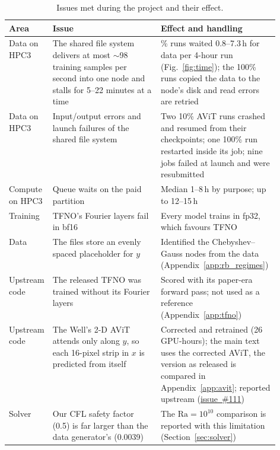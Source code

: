 \documentclass[11pt]{article}
\begin{document}
\begin{table}[tp]
\centering\footnotesize
\begin{tabularx}{\linewidth}{@{}>{\raggedright\arraybackslash}p{0.13\linewidth}>{\raggedright\arraybackslash}p{0.4\linewidth}>{\raggedright\arraybackslash}X@{}}
\toprule
Area & Issue & Effect and handling \\
\midrule
Data on HPC3 & The shared file system delivers at most $\sim$98 training samples per second into one node and stalls
for 5--22 minutes at a time & 10\% runs waited 0.8--7.3\,h for data per 4-hour run (Fig.~\ref{fig:time}); the 100\%
runs copied the data to the node's disk and read errors are retried \\ \addlinespace[3pt]
\midrule
Data on HPC3 & Input/output errors and launch failures of the shared file system & Two 10\% AViT runs crashed and
resumed from their checkpoints; one 100\% run restarted inside its job; nine jobs failed at launch and were
resubmitted \\ \addlinespace[3pt]
\midrule
Compute on HPC3 & Queue waits on the paid partition & Median 1--8\,h by purpose; up to 12--15\,h \\
\addlinespace[3pt]
\midrule
Training & TFNO's Fourier layers fail in bf16 & Every model trains in fp32, which favours TFNO \\ \addlinespace[3pt]
\midrule
Data & The files store an evenly spaced placeholder for $y$ & Identified the Chebyshev--Gauss nodes from the data
(Appendix~\ref{app:rb_regimes}) \\ \addlinespace[3pt]
\midrule
Upstream code & The released TFNO was trained without its Fourier layers & Scored with its paper-era forward pass;
not used as a reference (Appendix~\ref{app:tfno}) \\ \addlinespace[3pt]
\midrule
Upstream code & The Well's 2-D AViT attends only along $y$, so each 16-pixel strip in $x$ is predicted from itself &
Corrected and retrained (26 GPU-hours); the main text uses the corrected AViT, the version as released is compared in
Appendix~\ref{app:avit}; reported upstream (\href{https://github.com/PolymathicAI/the_well/issues/111}{issue~\#111}) \\ \addlinespace[3pt]
\midrule
Solver & Our CFL safety factor (0.5) is far larger than the data generator's (0.0039) & The $\mathrm{Ra}=10^{10}$
comparison is reported with this limitation (Section~\ref{sec:solver}) \\
\bottomrule
\end{tabularx}
\caption{Issues met during the project and their effect.}
\label{tab:issues}
\end{table}
\end{document}
